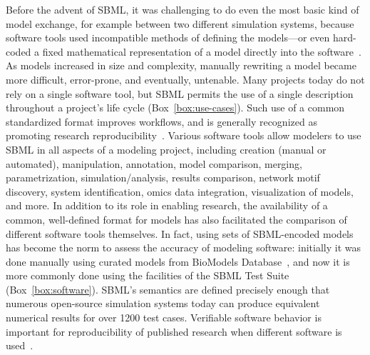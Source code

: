 \documentclass[]{draft-sbml-paper}
\begin{document}
Before the advent of SBML, it was challenging to do even the most basic kind of model exchange, for example between two different simulation systems, because software tools used incompatible methods of defining the models---or even hard-coded a fixed mathematical representation of a model directly into the software~\citep{Garfinkel1969construction}.  As models increased in size and complexity, manually rewriting a model became more difficult, error-prone, and eventually, untenable.  Many projects today do not rely on a single software tool, but SBML permits the use of a single description throughout a project's life cycle (Box~\ref{box:use-cases}).  Such use of a common standardized format improves workflows, and is generally recognized as promoting research reproducibility~\citep{Sandve2013ten, Waltemath2016how, Mendes2018reproducible, Stark2018reproducibility, Crook2013learning}.  Various software tools allow modelers to use SBML in all aspects of a modeling project, including creation (manual or automated), manipulation, annotation, model comparison, merging, parametrization, simulation/analysis, results comparison, network motif discovery, system identification, omics data integration, visualization of models, and more.  In addition to its role in enabling research, the availability of a common, well-defined format for models has also facilitated the comparison of different software tools themselves.  In fact, using sets of SBML-encoded models has become the norm to assess the accuracy of modeling software: initially it was done manually using curated models from BioModels Database~\citep{bergmann2008comparing}, and now it is more commonly done using the facilities of the SBML Test Suite (Box~\ref{box:software}).  SBML's semantics are defined precisely enough that numerous open-source simulation systems today can produce equivalent numerical results for over 1200 test cases.  Verifiable software behavior is important for reproducibility of published research when different software is used~\citep{Stodden2013reproducible, Peng2011reproducible, Hothorn2011case}.
\end{document}
